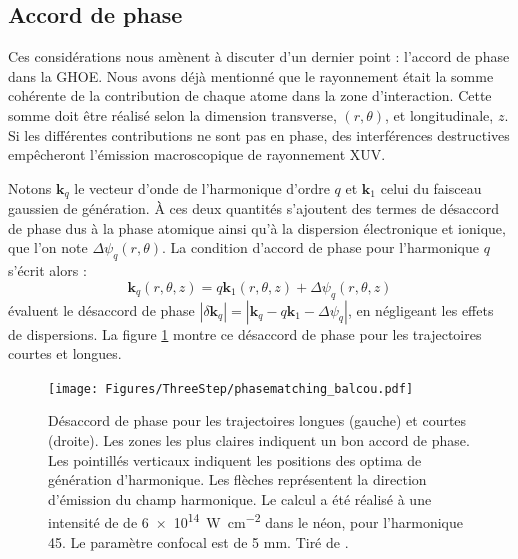 \subsection{Accord de phase}
Ces considérations nous amènent à discuter d'un dernier point : l'accord de phase dans la GHOE. Nous avons déjà mentionné que le rayonnement était la somme cohérente de la contribution de chaque atome dans la zone d'interaction. Cette somme doit être réalisé selon la dimension transverse, $(r,\theta)$, et longitudinale, $z$. Si les différentes contributions ne sont pas en phase, des interférences destructives empêcheront l'émission macroscopique de rayonnement XUV.

Notons $\bm{k}_q$ le vecteur d'onde de l'harmonique d'ordre $q$ et $\bm{k}_1$ celui du faisceau gaussien de génération. \`A ces deux quantités s'ajoutent des termes de désaccord de phase dus à la phase atomique ainsi qu'à la dispersion électronique et ionique, que l'on note $\Delta \psi_q(r,\theta)$. La condition d'accord de phase pour l'harmonique $q$ s'écrit alors  :
\begin{equation}
\bm{k}_q(r,\theta,z) = q\bm{k}_1(r,\theta,z) + \Delta \psi_q(r,\theta,z)
\end{equation}
 évaluent le désaccord de phase $|\delta \bm{k}_q| = |\bm{k}_q-q\bm{k}_1 - \Delta \psi_q|$, en négligeant les effets de dispersions. La figure \ref{fig:balcou} montre ce désaccord de phase pour les trajectoires courtes et longues. 

\begin{figure}[!ht]
\centering
\texttt{[image: Figures/ThreeStep/phasematching\_balcou.pdf]}%
\caption{Désaccord de phase pour les trajectoires longues (gauche) et courtes (droite). Les zones les plus claires indiquent un bon accord de phase. Les pointillés verticaux indiquent les positions des optima de génération d'harmonique. Les flèches représentent la direction d'émission du champ harmonique. Le calcul a été réalisé à une intensité de de \SI{6e14}{\W\per\cm\squared} dans le néon, pour l'harmonique 45. Le paramètre confocal est de 5 mm. Tiré de .}
\label{fig:balcou}
\end{figure}

